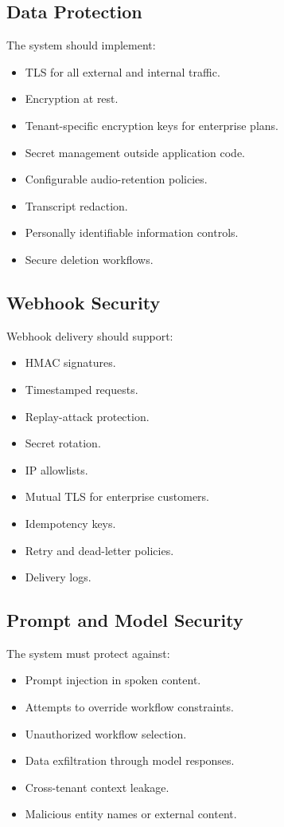 \documentclass[11pt,a4paper]{article}
\begin{document}
\subsection{Data Protection}

The system should implement:

\begin{itemize}
\item TLS for all external and internal traffic.
\item Encryption at rest.
\item Tenant-specific encryption keys for enterprise plans.
\item Secret management outside application code.
\item Configurable audio-retention policies.
\item Transcript redaction.
\item Personally identifiable information controls.
\item Secure deletion workflows.
\end{itemize}

\subsection{Webhook Security}

Webhook delivery should support:

\begin{itemize}
\item HMAC signatures.
\item Timestamped requests.
\item Replay-attack protection.
\item Secret rotation.
\item IP allowlists.
\item Mutual TLS for enterprise customers.
\item Idempotency keys.
\item Retry and dead-letter policies.
\item Delivery logs.
\end{itemize}

\subsection{Prompt and Model Security}

The system must protect against:

\begin{itemize}
\item Prompt injection in spoken content.
\item Attempts to override workflow constraints.
\item Unauthorized workflow selection.
\item Data exfiltration through model responses.
\item Cross-tenant context leakage.
\item Malicious entity names or external content.
\end{itemize}
\end{document}
